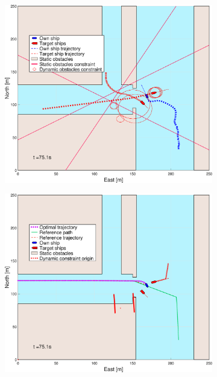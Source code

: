 \begin{figure}[ht]\ContinuedFloat
    \begin{subfigure}[b]{0.494\textwidth}
        \centering
        \includegraphics[width=\textwidth]{Images/Figures/Havn1/_Simple_0fig1_time=75}
        \subcaption{}
    \end{subfigure}
    \hfill
    \begin{subfigure}[b]{0.494\textwidth}
        \centering
        \includegraphics[width=\textwidth]{Images/Figures/Havn1/_Simple_0fig999_time=75}

\end{subfigure}
\end{figure}
